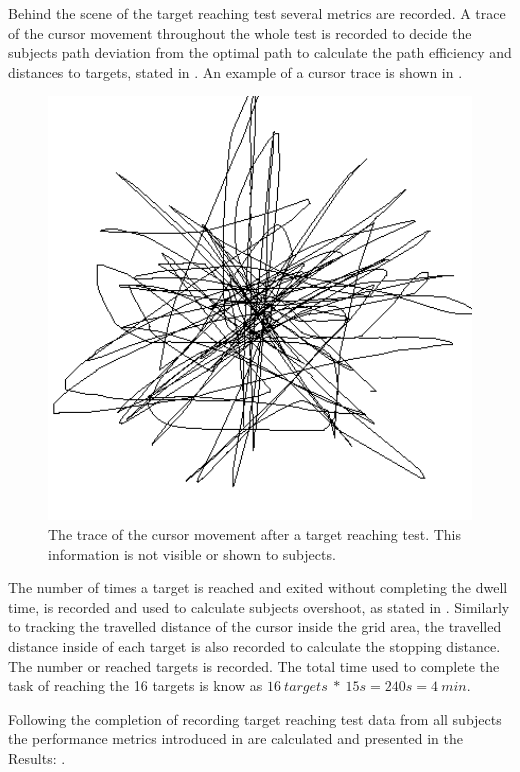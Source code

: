 Behind the scene of the target reaching test several metrics are recorded. A trace of the cursor movement throughout the whole test is recorded to decide the subjects path deviation from the optimal path to calculate the path efficiency and distances to targets, stated in . An example of a cursor trace is shown in . 

\begin{figure}[H] 
	\includegraphics[width=1\textwidth]{figures/pMethods/cursorTrace}
	\caption{The trace of the cursor movement after a target reaching test. This information is not visible or shown to subjects.}
	\label{fig:cursorTrace}
\end{figure}

The number of times a target is reached and exited without completing the dwell time, is recorded and used to calculate subjects overshoot, as stated in . Similarly to tracking the travelled distance of the cursor inside the grid area, the travelled distance inside of each target is also recorded to calculate the stopping distance. The number or reached targets is recorded. The total time used to complete the task of reaching the 16 targets is know as $16 ~targets~*~15s = 240s = 4~min$. 

Following the completion of recording target reaching test data from all subjects the performance metrics introduced in  are calculated and presented in the Results: .




